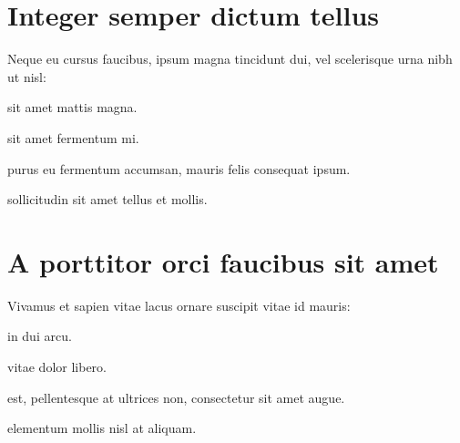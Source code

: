 \section*{Integer semper dictum tellus}

Neque eu cursus faucibus, ipsum magna tincidunt dui, vel scelerisque urna nibh ut nisl:

\begin{description}[labelwidth=\widthof{\bfseries morbi convallism},align=left]
\item[Duis]{sit amet mattis magna.}
\item[Curabitur]{sit amet fermentum mi.}
\item[Morbi convallis]{purus eu fermentum accumsan, mauris felis consequat ipsum.}
\item[Ut]{sollicitudin sit amet tellus et mollis.}
\end{description}

\section*{A porttitor orci faucibus sit amet}

Vivamus et sapien vitae lacus ornare suscipit vitae id mauris:

\begin{description}[labelwidth=\widthof{\bfseries suspendissem},align=left]
\item[Vivamus]{in dui arcu.}
\item[Morbi]{vitae dolor libero.}
\item[Tellus]{est, pellentesque at ultrices non, consectetur sit amet augue.}
\item[Suspendisse]{elementum mollis nisl at aliquam.}
\end{description}
